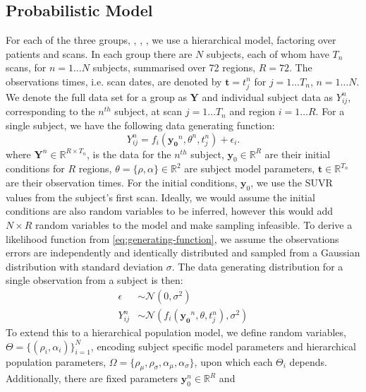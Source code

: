 \subsection{Probabilistic Model}
For each of the three groups, \ABN, \ABP \TPN, \ABP \TPP, we use a hierarchical
model, factoring over patients and scans. In each group there are $N$ subjects,
each of whom have $T_n$ scans, for $n = 1 \hdots N$ subjects, summarised
over 72 regions, $R = 72$. The observations times, i.e. scan dates, are denoted
by $\mathbf{t} = t^{n}_j$ for $j = 1 \hdots T_n$, $n = 1 \hdots N$. We denote
the full data set for a group as $\mathbf{Y}$ and individual subject data as
$Y^{n}_{ij}$, corresponding to the $n^{th}$ subject, at scan $j = 1 \hdots T_n$
and region $i = 1 \hdots R$. For a single subject, we have the following data 
generating function:
\begin{equation}
    \label{eq:generating-function}
    Y^{n}_{ij} = 
    f_i(\mathbf{y_0}^n, \theta^n, t^n_j) + \epsilon_i.
\end{equation}
where $\mathbf{Y}^{n} \in \mathbb{R}^{R \times T_{n}}$, is the data for the
$n^{th}$ subject, $\mathbf{y}_0 \in \mathbb{R}^{R}$ are their initial
conditions for $R$ regions, $\theta = \{\rho, \alpha\} \in \mathbb{R}^2$ are
subject model parameters, $\mathbf{t} \in \mathbb{R}^{T_{n}}$ are their
observation times. For the initial conditions, $\mathbf{y}_0$, we use the SUVR
values from the subject's first scan. Ideally, we would assume the initial
conditions are also random variables to be inferred, however this would add $N
\times R$ random variables to the model and make sampling infeasible. To derive
a likelihood function from \cref{eq:generating-function}, we assume the
observations errors are independently and identically distributed and sampled
from a Gaussian distribution with standard deviation $\sigma$. The data
generating distribution for a single observation from a subject is then:
\begin{align}
    \epsilon &\sim \mathcal{N}(0, \sigma^2) \\ 
    Y^{n}_{ij} &\sim \mathcal{N}(f_i(\mathbf{y_0}^n, \theta, t^n_j), \sigma^2)
\end{align}
To extend this to a hierarchical population model, we define random variables,
$\Theta = \{(\rho_i, \alpha_i)\}_{i=1}^{N}$, encoding subject specific model
parameters and hierarchical population parameters, $\Omega = \{ \rho_\mu ,
\rho_\sigma, \alpha_\mu, \alpha_\sigma \}$, upon which each $\Theta_i$ depends.
Additionally, there are fixed parameters $\mathbf{y}_0^n \in \mathbb{R}^{R}$ and
